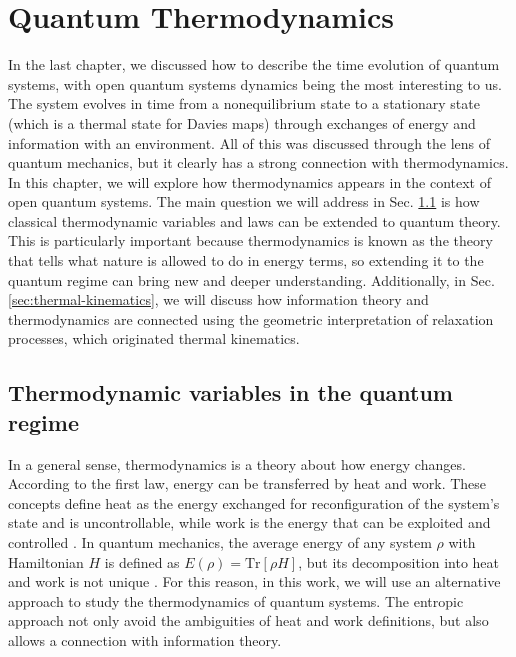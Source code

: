 

\chapter{Quantum Thermodynamics} \label{cap:thermo}




In the last chapter, we discussed how to describe the time evolution of quantum systems, with open quantum systems dynamics being the most interesting to us. The system evolves in time from a nonequilibrium state to a stationary state (which is a thermal state for Davies maps) through exchanges of energy and information with an environment. All of this was discussed through the lens of quantum mechanics, but it clearly has a strong connection with thermodynamics. In this chapter, we will explore how thermodynamics appears in the context of open quantum systems. The main question we will address in Sec. \ref{sec:thermo-variables} is how classical thermodynamic variables and laws can be extended to quantum theory. This is particularly important because thermodynamics is known as the theory that tells what nature is allowed to do in energy terms, so extending it to the quantum regime can bring new and deeper understanding. Additionally, in  Sec. \ref{sec:thermal-kinematics}, we will discuss how information theory and thermodynamics are connected using the geometric interpretation of relaxation processes, which originated thermal kinematics.

\section{Thermodynamic variables in the quantum regime} \label{sec:thermo-variables}

In a general sense, thermodynamics is a theory about how energy changes. According to the first law, energy can be transferred by heat and work. These concepts define heat as the energy exchanged for reconfiguration of the system's state and is uncontrollable, while work is the energy that can be exploited and controlled \cite{callen-book}. In quantum mechanics, the  average energy of any system ${\rho}$ with Hamiltonian ${H}$ is defined as $E({\rho}) = \text{Tr}[{\rho} {H}]$, but its decomposition into heat and work is not unique \cite{dann-2023, tanja-2025, alipour-2016}. For this reason, in this work, we will use an alternative approach to study the thermodynamics of quantum systems. The entropic approach not only avoid the ambiguities of heat and work definitions, but also allows a connection with information theory.

